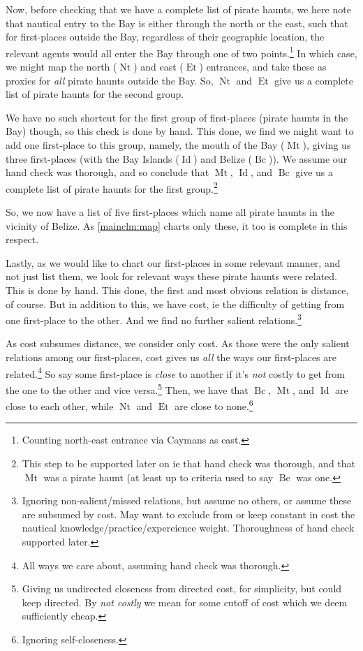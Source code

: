 \documentclass{amsart}
\newcommand{\mention}[1]{\textit{#1}}%
\DeclareMathOperator{\id}{Id}%
\DeclareMathOperator{\mt}{Mt}%
\DeclareMathOperator{\bc}{Bc}%
\DeclareMathOperator{\et}{Et}%
\DeclareMathOperator{\nt}{Nt}%
\theoremstyle{definition}
\theoremstyle{remark}
\begin{document}
			Now, before checking that we have a complete list of pirate haunts, we here note that nautical entry to the Bay is either through the north or the east, such that for first-places outside the Bay, regardless of their geographic location, the relevant agents would all enter the Bay through one of two points.\footnote{Counting north-east entrance via Caymans as east.} In which case, we might map the north (\(\nt\)) and east (\(\et\)) entrances, and take these as proxies for \emph{all} pirate haunts outside the Bay. So, \(\nt\) and \(\et\) give us a complete list of pirate haunts for the second group.
		
			We have no such shortcut for the first group of first-places (pirate haunts in the Bay) though, so this check is done by hand. This done, we find we might want to add one first-place to this group, namely, the mouth of the Bay (\(\mt\)), giving us three first-places (with the Bay Islands (\(\id\)) and Belize (\(\bc\))). We assume our hand check was thorough, and so conclude that \(\mt\), \(\id\), and \(\bc\) give us a complete list of pirate haunts for the first group.\footnote{This step to be supported later on ie that hand check was thorough, and that \(\mt\) was a pirate haunt (at least up to criteria used to say \(\bc\) was one.}
		
			So, we now have a list of five first-places which name all pirate haunts in the vicinity of Belize. As \ref{mainclm:map} charts only these, it too is complete in this respect.
		
			Lastly, as we would like to chart our first-places in some relevant manner, and not just list them, we look for relevant ways these pirate haunts were related. This is done by hand. This done, the first and most obvious relation is distance, of course. But in addition to this, we have cost, ie the difficulty of getting from one first-place to the other. And we find no further salient relations.\footnote{Ignoring non-salient/missed relations, but assume no others, or assume these are subsumed by cost. May want to exclude from or keep constant in cost the nautical knowledge/practice/expereience weight. Thoroughness of hand check supported later.}
			
			As cost subsumes distance, we consider only cost. As those were the only salient relations among our first-places, cost gives us \emph{all} the ways our first-places are related.\footnote{All ways we care about, assuming hand check was thorough.} So say some first-place is \mention{close} to another if it's \emph{not} costly to get from the one to the other and vice versa.\footnote{Giving us undirected closeness from directed cost, for simplicity, but could keep directed. By \mention{not costly} we mean for some cutoff of cost which we deem sufficiently cheap.} Then, we have that \(\bc\), \(\mt\), and \(\id\) are close to each other, while \(\nt\) and \(\et\) are close to none.\footnote{Ignoring self-closeness.}
			
\end{document}
